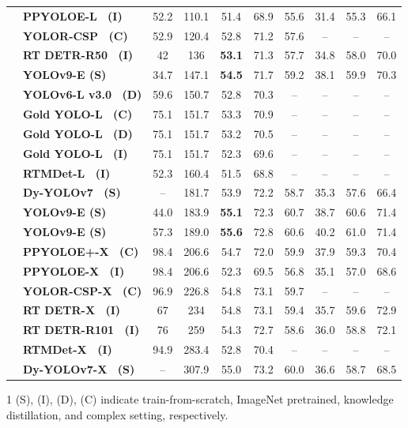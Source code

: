 \documentclass[10pt,twocolumn,letterpaper]{article}
\begin{document}
\begin{table}[t]
\begin{threeparttable}[t]
\begin{tabular}{l|lcccccccc}
				& \textbf{PPYOLOE-L~\cite{xu2022pp} (I)} & 52.2 & 110.1 & 51.4 & 68.9 & 55.6 & 31.4 & 55.3 & 66.1 \\
				& \textbf{YOLOR-CSP~\cite{wang2021you} (C)} & 52.9 & 120.4 & 52.8 & 71.2 & 57.6 & -- & -- & -- \\
				& \textbf{RT DETR-R50~\cite{lv2023detrs} (I)} & 42 & 136 & \textbf{53.1} & 71.3 & 57.7 & 34.8 & 58.0 & 70.0 \\
				& \textbf{YOLOv9-E (S)} & 34.7 & 147.1 & \textbf{54.5} & 71.7 & 59.2 & 38.1 & 59.9 & 70.3 \\
				& \textbf{YOLOv6-L v3.0~\cite{li2023yolov6} (D)} & 59.6 & 150.7 & 52.8 & 70.3 & -- & -- & -- & -- \\
				& \textbf{Gold YOLO-L~\cite{wang2023gold} (C)} & 75.1 & 151.7 & 53.3 & 70.9 & -- & -- & -- & -- \\
				& \textbf{Gold YOLO-L~\cite{wang2023gold} (D)} & 75.1 & 151.7 & 53.2 & 70.5 & -- & -- & -- & -- \\	
				& \textbf{Gold YOLO-L~\cite{wang2023gold} (I)} & 75.1 & 151.7 & 52.3 & 69.6 & -- & -- & -- & -- \\
				& \textbf{RTMDet-L~\cite{lyu2022rtmdet} (I)} & 52.3 & 160.4 & 51.5 & 68.8 & -- & -- & -- & -- \\
				& \textbf{Dy-YOLOv7~\cite{lin2023dynamicdet} (S)} & -- & 181.7 & 53.9 & 72.2 & 58.7 & 35.3 & 57.6 & 66.4 \\
				& \textbf{YOLOv9-E (S)} & 44.0 & 183.9 & \textbf{55.1} & 72.3 & 60.7 & 38.7 & 60.6 & 71.4 \\
				& \textbf{YOLOv9-E (S)} & 57.3 & 189.0 & \textbf{55.6} & 72.8 & 60.6 & 40.2 & 61.0 & 71.4 \\
				& \textbf{PPYOLOE+-X~\cite{xu2022pp} (C)} & 98.4 & 206.6 & 54.7 & 72.0 & 59.9 & 37.9 & 59.3 & 70.4 \\
				& \textbf{PPYOLOE-X~\cite{xu2022pp} (I)} & 98.4 & 206.6 & 52.3 & 69.5 & 56.8 & 35.1 & 57.0 & 68.6 \\
				& \textbf{YOLOR-CSP-X~\cite{wang2021you} (C)} & 96.9 & 226.8 & 54.8 & 73.1 & 59.7 &--  & -- & -- \\
				& \textbf{RT DETR-X~\cite{lv2023detrs} (I)} & 67 & 234 & 54.8 & 73.1 & 59.4 & 35.7 & 59.6 & 72.9 \\
				& \textbf{RT DETR-R101~\cite{lv2023detrs} (I)} & 76 & 259 & 54.3 & 72.7 & 58.6 & 36.0 & 58.8 & 72.1 \\
				& \textbf{RTMDet-X~\cite{lyu2022rtmdet} (I)} & 94.9 & 283.4 & 52.8 & 70.4 & -- & -- & -- & -- \\
				& \textbf{Dy-YOLOv7-X~\cite{lin2023dynamicdet} (S)} & -- & 307.9 & 55.0 & 73.2 & 60.0 & 36.6 & 58.7 & 68.5 \\
				\bottomrule
			\end{tabular}		
			\begin{tablenotes}[flushleft]
				\footnotesize
				\item[1] (S), (I), (D), (C) indicate train-from-scratch, ImageNet pretrained, knowledge distillation, and complex setting, respectively.
			\end{tablenotes}
		\end{threeparttable}
	\end{table}
	
\end{document}
